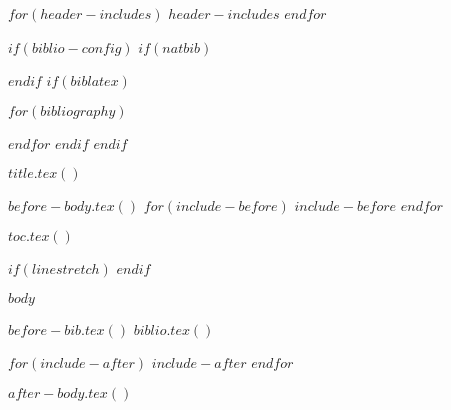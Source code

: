 $for(header-includes)$
$header-includes$
$endfor$

$if(biblio-config)$
$if(natbib)$
\usepackage[$natbiboptions$]{natbib}

$endif$
$if(biblatex)$
\usepackage[$if(biblio-style)$style=$biblio-style$,$endif$$for(biblatexoptions)$$biblatexoptions$$sep$,$endfor$]{biblatex}
$for(bibliography)$

$endfor$
$endif$
$endif$

\newenvironment{CSLReferences}[2]{
$if(natbib)$
$if(bibliography)$
$if(biblio-title)$
$if(has-chapters)$
\renewcommand\bibname{$biblio-title$}
$else$
\renewcommand\refname{$biblio-title$}
$endif$
$endif$

$endif$
$endif$
$if(biblatex)$
\printbibliography$if(biblio-title)$[title=$biblio-title$]$endif$
$endif$
\clearpage
}{}

\usepackage{hyperref}
\usepackage{url}

$title.tex()$




$before-body.tex()$
$for(include-before)$
$include-before$
$endfor$

$toc.tex()$

$if(linestretch)$
$endif$


$body$


$before-bib.tex()$
$biblio.tex()$

$for(include-after)$
$include-after$
$endfor$

$after-body.tex()$


